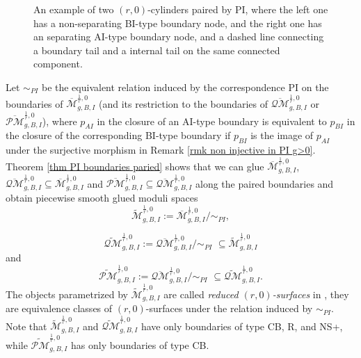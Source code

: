 \documentclass[11pt]{amsart}
\theoremstyle{definition}
\theoremstyle{remark}
\newcommand{\oPMb}{{\overline{\mathcal{PM}}}}
\newcommand{\oQMb}{{\overline{\mathcal{QM}}}}
\newcommand{\<}{\left<}
\renewcommand{\>}{\right>}
\numberwithin{equation}{section}
\def\Mbar{{\overline{\mathcal M}}}
\def\PI{{\text{PI}}}
\def\PI{\text{PI}}
\begin{document}
\begin{figure}
\begin{subfigure}{.45\textwidth}
\begin{tikzpicture}[scale=0.5]
\end{tikzpicture}
        \end{subfigure}
        \caption{An example of two $(r,0)$-cylinders paired by $\PI$, where the left one has a non-separating BI-type boundary node, and the right one has an separating AI-type %
boundary node, and %
a dashed line connecting a boundary tail and a internal tail on the same connected component.}
        \label{fig point insertion at non separationg}
    \end{figure}
 

  Let $\sim_{PI}$ be the equivalent relation induced by the correspondence $\PI$ on the boundaries of $\Mbar^{\frac{1}{r},0}_{g,B,I}$ (and its restriction to the boundaries of $\oQMb^{\frac{1}{r},0}_{g,B,I}$ or $\oPMb^{\frac{1}{r},0}_{g,B,I}$), where $p_{AI}$ in the closure of an AI-type boundary is equivalent to $p_{BI}$ in the closure of the corresponding BI-type boundary if $p_{BI}$ is the image of $p_{AI}$ under the surjective morphism in Remark \ref{rmk non injective in PI g>0}. Theorem \ref{thm  PI boundaries paried} shows that we can glue $\Mbar^{\frac{1}{r},0}_{g,B,I}$, $\oQMb^{\frac{1}{r},0}_{g,B,I}\subseteq \Mbar^{\frac{1}{r},0}_{g,B,I}$ and $\oPMb^{\frac{1}{r},0}_{g,B,I}\subseteq \oQMb^{\frac{1}{r},0}_{g,B,I}$ along the paired boundaries and obtain piecewise smooth glued moduli %
spaces
    $$
    \widetilde{\mathcal M}^{\frac{1}{r},0}_{g,B,I}:=\Mbar^{\frac{1}{r},0}_{g,B,I}\big/\sim_{PI},
    $$
    
    $$
    \widetilde{\mathcal{QM}}^{\frac{1}{r},0}_{g,B,I}:=\overline{\mathcal{QM}}^{\frac{1}{r},0}_{g,B,I}\big/\sim_{PI} \,\, \subseteq \widetilde{\mathcal M}^{\frac{1}{r},0}_{g,B,I}
    $$
    and %
    $$
     \widetilde{\mathcal{PM}}^{\frac{1}{r},0}_{g,B,I}:=\overline{\mathcal{QM}}^{\frac{1}{r},0}_{g,B,I}\big/\sim_{PI} \,\,\subseteq \widetilde{\mathcal{QM}}^{\frac{1}{r},0}_{g,B,I}.
    $$
    The objects parametrized by $\widetilde{\mathcal M}^{\frac{1}{r},0}_{g,B,I}$  are called \textit{reduced $(r,0)$-surfaces} %
in \cite{TZ1}, they are %
equivalence classes of $(r,0)$-surfaces under the relation induced by $\sim_{PI}$. Note that $\widetilde{\mathcal M}^{\frac{1}{r},0}_{g,B,I}$ and $\widetilde{\mathcal {QM}}^{\frac{1}{r},0}_{g,B,I}$ have only boundaries of type CB, R, and NS+, while $\widetilde{\mathcal {PM}}^{\frac{1}{r},0}_{g,B,I}$ has only boundaries of type CB.
    
\end{document}
